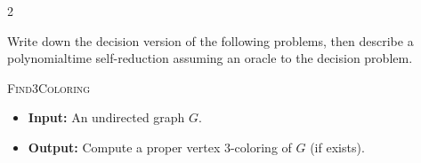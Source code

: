 \documentclass[12pt]{article}
\begin{document}
\newpage

\begin{problem}{2}
    
    Write down the decision version of the following problems, then describe a polynomialtime self-reduction assuming an oracle to the decision problem.
     \begin{tcolorbox}
            \textsc{Find3Coloring}
            \begin{itemize}
                \item \textbf{Input:} An undirected graph $G$. 
                \item \textbf{Output:} Compute a proper vertex $3$-coloring of $G$ (if exists). 
            \end{itemize}
    \end{tcolorbox}
\end{problem}
\end{document}
